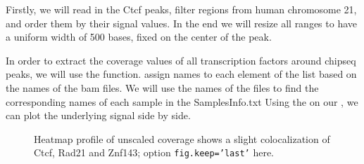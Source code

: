 \documentclass{article}\usepackage[]{graphicx}\usepackage[]{color}
\makeatletter
\newenvironment{kframe}{%
 \def\at@end@of@kframe{}%
 \ifinner\ifhmode%
  \def\at@end@of@kframe{\end{minipage}}%
  \begin{minipage}{\columnwidth}%
 \fi\fi%
 \def\FrameCommand##1{\hskip\@totalleftmargin \hskip-\fboxsep
 \colorbox{shadecolor}{##1}\hskip-\fboxsep
     \hskip-\linewidth \hskip-\@totalleftmargin \hskip\columnwidth}%
 \MakeFramed {\advance\hsize-\width
   \@totalleftmargin\z@ \linewidth\hsize
   \@setminipage}}%
 {\par\unskip\endMakeFramed%
 \at@end@of@kframe}
\newenvironment{knitrout}{}{} %
\makeatother
\begin{document}
Firstly, we will read in the Ctcf peaks, filter regions from human chromosome 21,
and order them by their signal values. In the end we will resize all ranges to have a uniform
width of 500 bases, fixed on the center of the peak.
\begin{knitrout}
\color{fgcolor}\begin{kframe}


{\ttfamily\noindent\bfseries{}}

{\ttfamily\noindent\bfseries\color{errorcolor}{\#\# Error: object 'ctcf.peaks' not found}}

{\ttfamily\noindent\bfseries\color{errorcolor}{\#\# Error: object 'ctcf.peaks' not found}}

{\ttfamily\noindent\bfseries\color{errorcolor}{\#\# Error: error in evaluating the argument 'x' in selecting a method for function 'resize': Error: object 'ctcf.peaks' not found}}\end{kframe}
\end{knitrout}



In order to extract the coverage values of all transcription factors around 
chipseq peaks, we will use the  function. 
 assign names to each element of the list based on the names of the bam files. We
will use the names of the files to find the corresponding names of each sample in the SamplesInfo.txt
Using the  on our , 
we can plot the underlying signal side by side.

\begin{figure}
\begin{knitrout}
\color{fgcolor}\begin{kframe}


{\ttfamily\noindent\bfseries{}}

{\ttfamily\noindent\bfseries\color{errorcolor}{\#\# Error: error in evaluating the argument 'x' in selecting a method for function 'match': Error: object 'sml' not found}}

{\ttfamily\noindent\bfseries{}}\end{kframe}
\end{knitrout}

\caption{Heatmap profile of unscaled coverage shows a slight colocalization of Ctcf, Rad21 and Znf143;
option \texttt{fig.keep='last'} here.\label{fig:ctcfScoreMatrixList}}
\end{figure}
\end{document}
